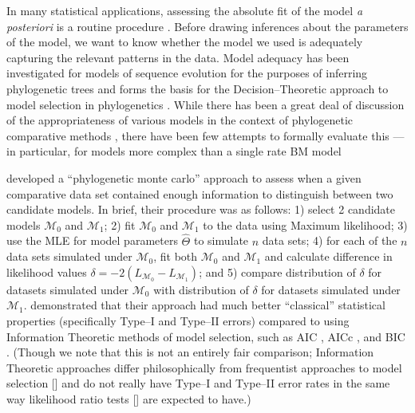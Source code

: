 \documentclass[12pt]{article}
\begin{document}
In many statistical applications, assessing the absolute fit of the model \textit{a posteriori} is a routine procedure \citep{Gelmanbook}. Before drawing inferences about the parameters of the model, we want to know whether the model we used is adequately capturing the relevant patterns in the data. Model adequacy has been investigated for models of sequence evolution for the purposes of inferring phylogenetic trees \citep[e.g.][]{GautLewis1995, SullivanSwofford, Goldman, HuelsenbeckBull1996, SandersonKim, Bollback2002, Ripplinger2010, Lewis2013, Brown2013} and forms the basis for the Decision--Theoretic approach to model selection in phylogenetics \citep{Minin2003, Abdo2005, SullivanJoyce2005}. While there has been a great deal of discussion of the appropriateness of various models in the context of phylogenetic comparative methods \citep[e.g.][]{Felsenstein1985, Felsenstein1988, HarveyPagel1991, Pagel1993, Diaz1996, Price1997, GarlandIves2000, Rohlf2006, Freckleton2009, Hansen2012}, there have been few attempts to formally evaluate this --- in particular, for models more complex than a single rate BM model

\citet{Boettiger2012} developed a ``phylogenetic monte carlo'' approach to assess when a given comparative data set contained enough information to distinguish between two candidate models. In brief, their procedure was as follows: 1) select 2 candidate models $\mathcal{M}_0$ and $\mathcal{M}_1$; 2) fit $\mathcal{M}_0$ and $\mathcal{M}_1$ to the data using Maximum likelihood; 3) use the MLE for model parameters $\hat{\Theta}$ to simulate $n$ data sets; 4) for each of the $n$ data sets simulated under $\mathcal{M}_0$, fit both $\mathcal{M}_0$ and $\mathcal{M}_1$ and calculate difference in likelihood values $\delta = -2(L_{\mathcal{M}_0} - L_{\mathcal{M}_1})$; and 5) compare distribution of $\delta$ for datasets simulated under $\mathcal{M}_0$ with distribution of $\delta$ for datasets simulated under $\mathcal{M}_1$. \citet{Boettiger2012} demonstrated that their approach had much better ``classical'' statistical properties (specifically Type--I and Type--II errors) compared to using Information Theoretic methods of model selection, such as AIC \citep{Akaike1973}, AICc \citep{AICC}, and BIC \citep{Schwarz1978}. (Though we note that this is not an entirely fair comparison; Information Theoretic approaches differ philosophically from frequentist approaches to model selection [\citealt{BA2004}] and do not really have Type--I and Type--II error rates in the same way likelihood ratio tests [\citealt{Wilks1938}] are expected to have.)
\end{document}
